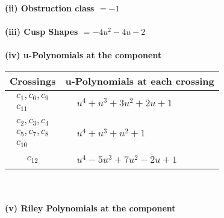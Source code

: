 \documentclass[1p]{elsarticle_modified}
\theoremstyle{definition}
\begin{document}
\flushleft \textbf{(ii) Obstruction class $= -1$}\\~\\
\flushleft \textbf{(iii) Cusp Shapes $= -4 u^2-4 u-2$}\\~\\
\newpage\renewcommand{\arraystretch}{1}
\flushleft \textbf{(iv) u-Polynomials at the component}\newline \\
\begin{tabular}{m{50pt}|m{274pt}}
Crossings & \hspace{64pt}u-Polynomials at each crossing \\
\hline $$\begin{aligned}c_{1},c_{6},c_{9}\\c_{11}\end{aligned}$$&$\begin{aligned}
&u^4+u^3+3 u^2+2 u+1
\end{aligned}$\\
\hline $$\begin{aligned}c_{2},c_{3},c_{4}\\c_{5},c_{7},c_{8}\\c_{10}\end{aligned}$$&$\begin{aligned}
&u^4+u^3+u^2+1
\end{aligned}$\\
\hline $$\begin{aligned}c_{12}\end{aligned}$$&$\begin{aligned}
&u^4-5 u^3+7 u^2-2 u+1
\end{aligned}$\\
\hline
\end{tabular}\\~\\
\newpage\renewcommand{\arraystretch}{1}
\flushleft \textbf{(v) Riley Polynomials at the component}\newline \\
\end{document}
